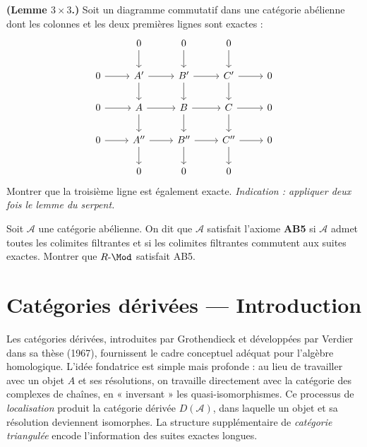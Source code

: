 \begin{exercice}\label{exo:nine-lemma}
\textbf{(Lemme $3 \times 3$.)}
Soit un diagramme commutatif dans une catégorie abélienne dont les
colonnes et les deux premières lignes sont exactes :
\[
\begin{tikzcd}
& 0 \arrow[d] & 0 \arrow[d] & 0 \arrow[d] \\
0 \arrow[r] & A' \arrow[r] \arrow[d] & B' \arrow[r] \arrow[d] & C' \arrow[r] \arrow[d] & 0 \\
0 \arrow[r] & A \arrow[r] \arrow[d] & B \arrow[r] \arrow[d] & C \arrow[r] \arrow[d] & 0 \\
0 \arrow[r] & A'' \arrow[r] \arrow[d] & B'' \arrow[r] \arrow[d] & C'' \arrow[r] \arrow[d] & 0 \\
& 0 & 0 & 0
\end{tikzcd}
\]
Montrer que la troisième ligne est également exacte.
\textit{Indication : appliquer deux fois le lemme du serpent.}
\end{exercice}

\begin{exercice}\label{exo:grothendieck-AB5}
Soit $\mathcal{A}$ une catégorie abélienne. On dit que $\mathcal{A}$
satisfait l'axiome \textbf{AB5} si $\mathcal{A}$ admet
toutes les colimites filtrantes et si les colimites filtrantes
commutent aux suites exactes. Montrer que $R\text{-}\Mod$ satisfait AB5.
\end{exercice}




\chapter{Catégories dérivées --- Introduction}\label{ch:derived}
\minitoc

\vspace{1em}

Les catégories dérivées, introduites par
Grothendieck et développées par
Verdier dans sa thèse (1967), fournissent le
cadre conceptuel adéquat pour l'algèbre homologique. L'idée fondatrice est
simple mais profonde : au lieu de travailler avec un objet $A$ et ses
résolutions, on travaille directement avec la catégorie des complexes de
chaînes, en « inversant » les quasi-isomorphismes. Ce processus de
\emph{localisation} produit la catégorie
dérivée $D(\mathcal{A})$, dans laquelle un objet et sa résolution deviennent
isomorphes. La structure supplémentaire de \emph{catégorie
triangulée} encode l'information des suites
exactes longues.

